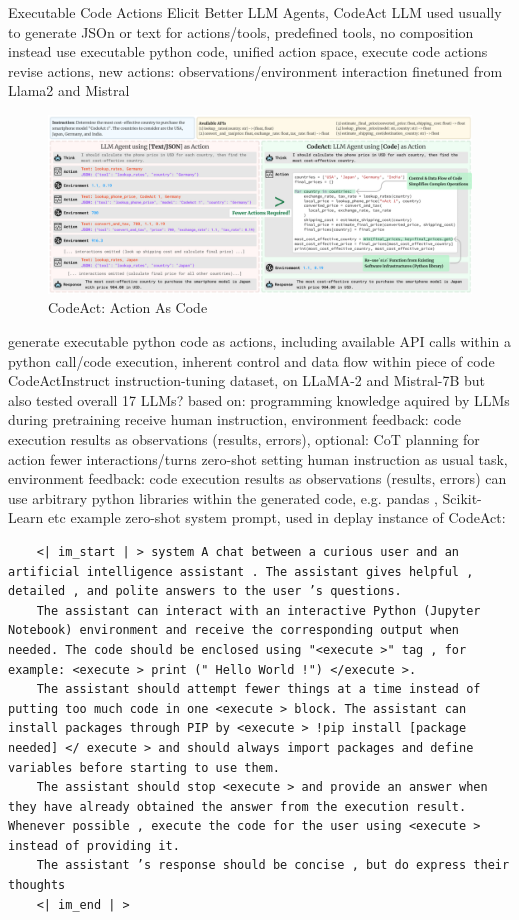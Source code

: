 \documentclass{article}
\begin{document}
\cite{wang_executable_2024} Executable Code Actions Elicit Better LLM Agents, CodeAct
LLM used usually to generate JSOn or text for actions/tools, predefined tools, no composition
instead use executable python code, unified action space, execute code actions
revise actions, new actions: observations/environment interaction
finetuned from Llama2 and Mistral
\begin{figure}[h]
	\centering
	\includegraphics[width=1.0\linewidth]{CodeAct-ActionAsCode}
	\caption{CodeAct: Action As Code \cite{wang_executable_2024} }
	\label{fig:codeact-actionascode}
\end{figure}
generate executable python code as actions, including available API calls within a python call/code execution, inherent control and data flow within piece of code
CodeActInstruct instruction-tuning dataset, on LLaMA-2 and Mistral-7B
but also tested overall 17 LLMs?
based on: programming knowledge aquired by LLMs during pretraining
receive human instruction, environment feedback: code execution results as observations (results, errors), optional: CoT planning for action
fewer interactions/turns
zero-shot setting
human instruction as usual task, environment feedback: code execution results as observations (results, errors)
can use arbitrary python libraries within the generated code, e.g. pandas , Scikit-Learn etc
example zero-shot system prompt, used in deplay instance of CodeAct:
\begin{verbatim}
	<| im_start | > system A chat between a curious user and an artificial intelligence assistant . The assistant gives helpful , detailed , and polite answers to the user ’s questions. 
	The assistant can interact with an interactive Python (Jupyter Notebook) environment and receive the corresponding output when needed. The code should be enclosed using "<execute >" tag , for example: <execute > print (" Hello World !") </execute >. 
	The assistant should attempt fewer things at a time instead of putting too much code in one <execute > block. The assistant can install packages through PIP by <execute > !pip install [package needed] </ execute > and should always import packages and define variables before starting to use them. 
	The assistant should stop <execute > and provide an answer when they have already obtained the answer from the execution result. Whenever possible , execute the code for the user using <execute > instead of providing it. 
	The assistant ’s response should be concise , but do express their thoughts
	<| im_end | >
\end{verbatim}
\end{document}
